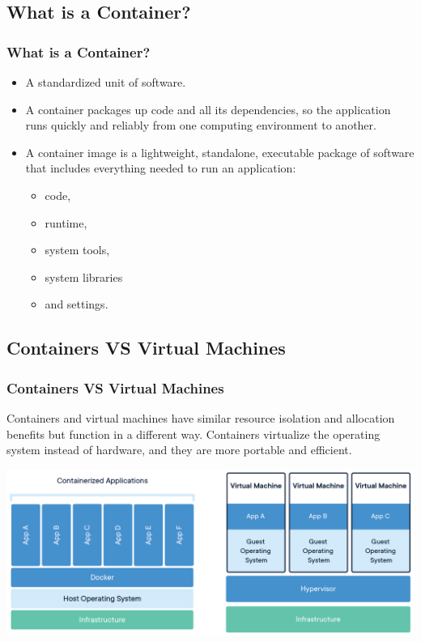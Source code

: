 \subsection{What is a Container?}
\begin{frame}
	\frametitle{What is a Container?}
	\begin{itemize}
		\item A standardized unit of software.
		\item A container packages up code and all its dependencies, so the application runs quickly and reliably from one computing environment to another.
		\item A container image is a lightweight, standalone, executable package of software that includes everything needed to run an application: 
		\begin{itemize}
			\item code, 
			\item runtime, 
			\item system tools, 
			\item system libraries 
			\item and settings.
		\end{itemize}
	\end{itemize}
\end{frame}

\subsection{Containers VS Virtual Machines}
\begin{frame}
	\frametitle{Containers VS Virtual Machines}
	Containers and virtual machines have similar resource isolation and allocation benefits but function in a  different way. Containers virtualize the operating system instead of hardware, and they are more portable and efficient.
	\linebreak
	
	\centering
	\includegraphics[width=\linewidth]{figures/docker-containerized-and-vm-transparent-bg.png}
\end{frame}

